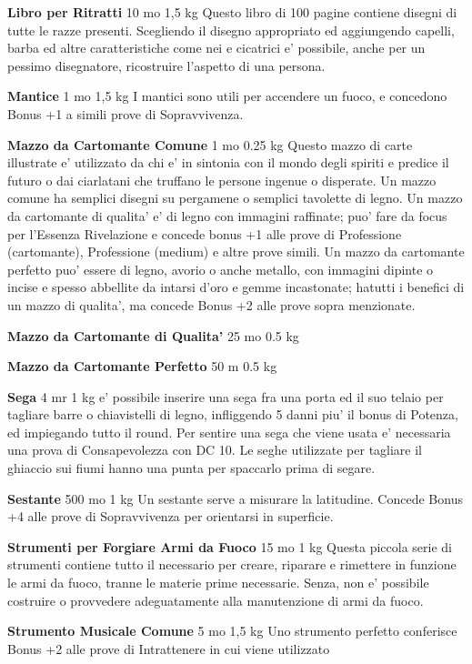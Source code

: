 \documentclass[a4paper,11pt,twoside,openany]{book}
\begin{document}
{\textbf{Libro per Ritratti} 10 mo 1,5 kg Questo libro di 100 pagine contiene disegni di tutte le razze presenti. Scegliendo il disegno appropriato ed aggiungendo capelli, barba ed altre caratteristiche come nei e cicatrici e' possibile, anche per un pessimo disegnatore, ricostruire l'aspetto di una persona.

\textbf{Mantice} 1 mo 1,5 kg I mantici sono utili per accendere un fuoco, e concedono Bonus +1 a simili prove di Sopravvivenza.

\textbf{Mazzo da Cartomante Comune} 1 mo 0.25 kg Questo mazzo di carte illustrate e' utilizzato da chi e' in sintonia con il mondo degli spiriti e predice il futuro o dai ciarlatani che truffano le persone ingenue o disperate. Un mazzo comune ha semplici disegni su pergamene o semplici tavolette di legno. Un mazzo da cartomante di qualita' e' di legno con immagini raffinate; puo' fare da focus per l'Essenza Rivelazione e concede bonus +1 alle prove di Professione (cartomante), Professione (medium) e altre prove simili. Un mazzo da cartomante perfetto puo' essere di legno, avorio o anche metallo, con immagini dipinte o incise e spesso abbellite da intarsi d'oro e gemme incastonate; hatutti i benefici di un mazzo di qualita', ma concede Bonus +2 alle prove sopra menzionate.

\textbf{Mazzo da Cartomante di Qualita'} 25 mo 0.5 kg

\textbf{Mazzo da Cartomante Perfetto} 50 m 0.5 kg

\textbf{Sega} 4 mr 1 kg e' possibile inserire una sega fra una porta ed il suo telaio per tagliare barre o chiavistelli di legno, infliggendo 5 danni piu' il bonus di Potenza, ed impiegando tutto il round. Per sentire una sega che viene usata e' necessaria una prova di Consapevolezza con DC 10. Le seghe utilizzate per tagliare il ghiaccio sui fiumi hanno una punta per spaccarlo prima di segare.

\textbf{Sestante} 500 mo 1 kg Un sestante serve a misurare la latitudine. Concede Bonus +4 alle prove di Sopravvivenza per orientarsi in superficie.

\textbf{Strumenti per Forgiare Armi da Fuoco} 15 mo 1 kg Questa piccola serie di strumenti contiene tutto il necessario per creare, riparare e rimettere in funzione le armi da fuoco, tranne le materie prime necessarie. Senza, non e' possibile costruire o provvedere adeguatamente alla manutenzione di armi da fuoco.

\textbf{Strumento Musicale Comune} 5 mo 1,5 kg Uno strumento perfetto conferisce Bonus +2 alle prove di Intrattenere in cui viene utilizzato

}
\end{document}
